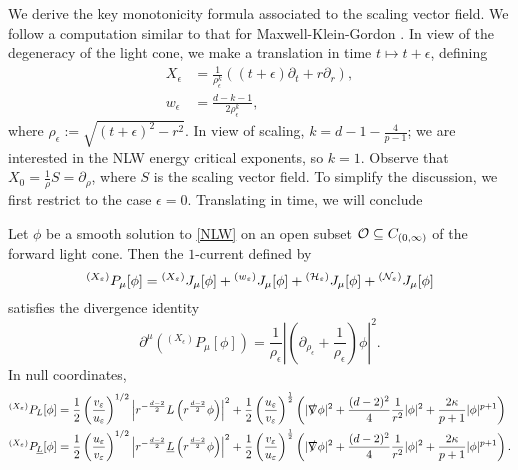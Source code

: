 
We derive the key monotonicity formula associated to the scaling vector field. We follow a computation similar to that for Maxwell-Klein-Gordon \cite[Section 5]{OhTataru2016}. In view of the degeneracy of the light cone, we make a translation in time $t \mapsto t + \epsilon$, defining 
	\begin{align*}
		X_\epsilon
			&= \frac{1}{\rho_\epsilon^k} ((t + \epsilon) \partial_t + r \partial_r), \\
		w_\epsilon
			&= \frac{d - k - 1}{2 \rho^k_\epsilon},	
	\end{align*}
where $\rho_\epsilon := \sqrt{(t + \epsilon)^2 - r^2}$. In view of scaling, $k = d - 1 - \tfrac{4}{p - 1}$; we are interested in the NLW energy critical exponents, so $k = 1$. Observe that $X_0 = \tfrac1\rho S = \partial_\rho$, where $S$ is the scaling vector field. To simplify the discussion, we first restrict to the case $\epsilon = 0$. Translating in time, we will conclude


\begin{theorem}
	Let $\phi$ be a smooth solution to \eqref{NLW} on an open subset $\cO \subseteq C_{(0, \infty)}$ of the forward light cone. Then the $1$-current defined by 
		\begin{equation}
			^{(X_\epsilon)}P_\mu [\phi]
				= {^{(X_\epsilon)}} J_\mu [\phi] + {^{(w_\epsilon)}} J_\mu [\phi] + {^{(\cH_\epsilon)}} J_\mu [\phi] +  {^{(\cN_\epsilon)}} J_\mu [\phi]
		\end{equation}	
	satisfies the divergence identity
		\begin{equation}
			\partial^\mu \left( {^{(X_\epsilon)}} P_\mu [\phi] \right) = \frac{1}{\rho_\epsilon} \left| \left( \partial_{\rho_\epsilon} + \frac1{\rho_\epsilon} \right)\phi \right|^2.
		\end{equation}	
	In null coordinates,
		\begin{equation}
		\begin{split}
			{^{(X_\epsilon)}} P_L [\phi]
				&= \frac12 \left( \frac{v_\epsilon}{u_\epsilon} \right)^{1/2} \left| r^{-\frac{d - 2}{2}} L \left( r^{\frac{d - 2}{2}} \phi \right)\right|^2 + \frac12 \left( \frac{u_\epsilon}{v_\epsilon} \right)^\frac12 \left( |\slashed \nabla \phi|^2 + \frac{(d - 2)^2}{4} \frac1{r^2} |\phi|^2 + \frac{2\kappa}{p + 1} |\phi|^{p + 1} \right)\\
			{^{(X_\epsilon)}} P_{\underline L} [\phi]
				&= \frac12 \left( \frac{u_\epsilon}{v_\epsilon} \right)^{1/2} \left| r^{-\frac{d - 2}{2}} \underline L \left( r^{\frac{d - 2}{2}} \phi \right)\right|^2 + \frac12 \left( \frac{v_\epsilon}{u_\epsilon} \right)^\frac12 \left(  |\slashed \nabla \phi|^2 + \frac{(d - 2)^2}{4} \frac1{r^2} |\phi|^2 + \frac{2\kappa}{p + 1} |\phi|^{p + 1} \right)	.
		\end{split}	
		\end{equation}	
\end{theorem}

